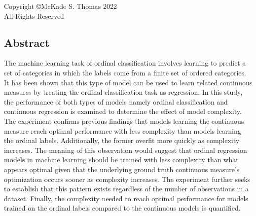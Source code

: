 \documentclass[10pt]{article}\usepackage[]{graphicx}\usepackage[]{xcolor}
\begin{document}
\onecolumn

\newpage

\hspace{0pt}
\vfill
\thispagestyle{empty}
\begin{center}
\LARGE
Copyright \copyright \space McKade S. Thomas 2022 \\
All Rights Reserved
\end{center}
\vfill
\hspace{0pt}

\newpage


\Large\begin{center}
\section*{Abstract}
\end{center}

The machine learning task of ordinal classification involves learning to predict a set of categories in which the labels come from a finite set of ordered categories. It has been shown that this type of model can be used to learn related continuous measures by treating the ordinal classification task as regression. In this study, the performance of both types of models namely ordinal classification and continuous regression is examined to determine the effect of model complexity. The experiment confirms previous findings that models learning the continuous measure reach optimal performance with less complexity than models learning the ordinal labels. Additionally, the former overfit more quickly as complexity increases. The meaning of this observation would suggest that ordinal regression models in machine learning should be trained with less complexity than what appears optimal given that the underlying ground truth continuous measure's optimization occurs sooner as complexity increases. The experiment further seeks to establish that this pattern exists regardless of the number of observations in a dataset. Finally, the complexity needed to reach optimal performance for models trained on the ordinal labels compared to the continuous models is quantified.

\newpage
\end{document}

